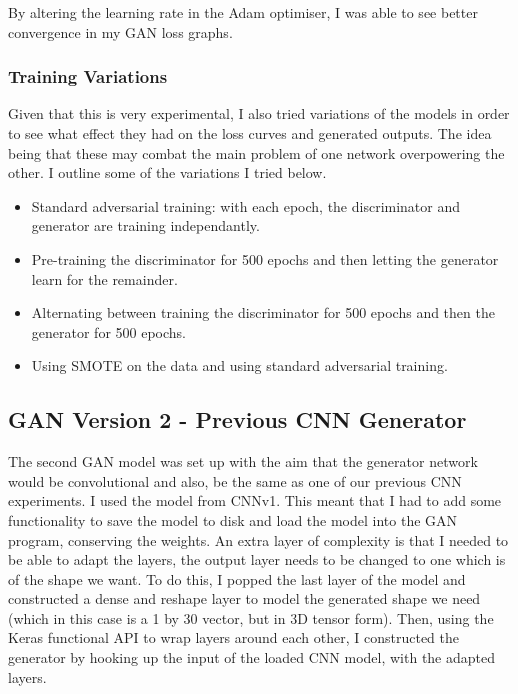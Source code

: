 \documentclass[12pt,a4paper,twoside]{report}
\begin{document}
By altering the learning rate in the Adam optimiser, I was able to see better convergence in my GAN loss graphs. 

\subsubsection{Training Variations}

Given that this is very experimental, I also tried variations of the models in order to see what effect they had on the loss curves and generated outputs. The idea being that these may combat the main problem of one network overpowering the other. I outline some of the variations I tried below.

\begin{itemize}
\item Standard adversarial training: with each epoch, the discriminator and generator are training independantly. 
\item Pre-training the discriminator for 500 epochs and then letting the generator learn for the remainder.
\item Alternating between training the discriminator for 500 epochs and then the generator for 500 epochs.
\item Using SMOTE on the data and using standard adversarial training.
\end{itemize}

\subsection{GAN Version 2 - Previous CNN Generator}

The second GAN model was set up with the aim that the generator network would be convolutional and also, be the same as one of our previous CNN experiments. I used the model from CNNv1. This meant that I had to add some functionality to save the model to disk and load the model into the GAN program, conserving the weights. An extra layer of complexity is that I needed to be able to adapt the layers, the output layer needs to be changed to one which is of the shape we want. To do this, I popped the last layer of the model and constructed a dense and reshape layer to model the generated shape we need (which in this case is a 1 by 30 vector, but in 3D tensor form). Then, using the Keras functional API to wrap layers around each other, I constructed the generator by hooking up the input of the loaded CNN model, with the adapted layers. 
\end{document}
